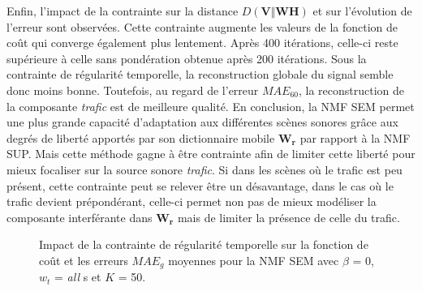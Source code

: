 Enfin, l'impact de la contrainte sur la distance $D(\mathbf{V}\Vert \mathbf{WH})$  et sur l'évolution de l'erreur sont observées. Cette contrainte augmente les valeurs de la fonction de coût qui converge également plus lentement. Après 400 itérations, celle-ci reste supérieure à celle sans pondération obtenue après 200 itérations. Sous la contrainte de régularité temporelle, la reconstruction globale du signal semble donc moins bonne. Toutefois, au regard de l'erreur $MAE_{60}$, la reconstruction de la composante \textit{trafic} est de meilleure qualité.
En conclusion, la NMF SEM permet une plus grande capacité d'adaptation aux différentes scènes sonores grâce aux degrés de liberté apportés par son dictionnaire mobile $\mathbf{W_r}$ par rapport à la NMF SUP. Mais cette méthode gagne à être contrainte afin de limiter cette liberté pour mieux focaliser sur la source sonore \textit{trafic}. Si dans les scènes où le trafic est peu présent, cette contrainte peut se relever être un désavantage, dans le cas où le trafic devient prépondérant, celle-ci permet non pas de mieux modéliser la composante interférante dans $\mathbf{W_r}$ mais de limiter la présence de celle du trafic.

\begin{figure}[h!]
\centering
{}%
\qquad
{}%
\caption{Impact de la contrainte de régularité temporelle sur la fonction de coût et les erreurs $MAE_g$ moyennes pour la NMF SEM avec $\beta$ = 0, $w_t$ = \textit{all} s et $K$ = 50.}
\label{fig:evolution_mae_sm}
\end{figure}


